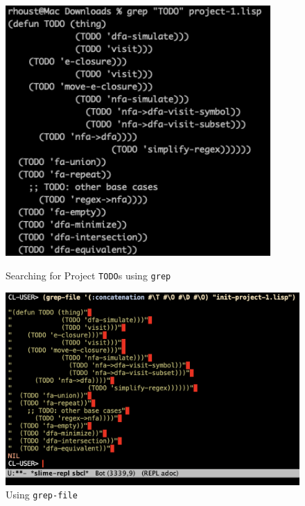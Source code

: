 \documentclass[12pt,letterpaper]{ntdhw}
\begin{document}
\begin{enumerate}
  \begin{figure}[h!]
    \centering
    \begin{minipage}{0.45\textwidth}
        \centering
        \includegraphics[width=0.9\textwidth]{grepScreenCap.png}
        \caption{Searching for Project \texttt{TODO}s using \texttt{grep}}
    \end{minipage}\hfill
    \begin{minipage}{0.55\textwidth}
        \centering
        \includegraphics[width=1.0\textwidth]{1_project.png}
        \caption{Using \texttt{grep-file}}
    \end{minipage}
  \end{figure}


\end{enumerate}
\end{document}
